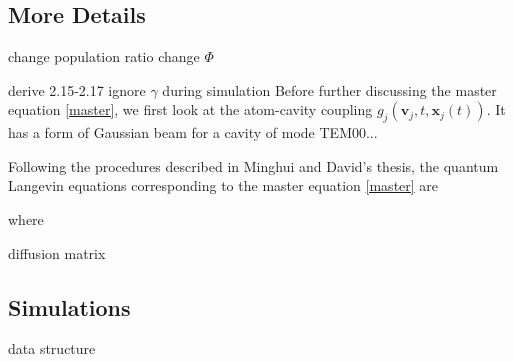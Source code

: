 \documentclass{article}
\begin{document}
\subsection{More Details}
change population ratio
change $\Phi$

derive 2.15-2.17
ignore $\gamma$ during simulation
Before further discussing the master equation \ref{master}, we first look at the atom-cavity coupling $g_j(\textbf{v}_j,t,\textbf{x}_j(t))$. It has a form of Gaussian beam for a cavity of mode TEM00...

Following the procedures described in Minghui and David's thesis, the quantum Langevin equations corresponding to the master equation \ref{master} are

where

diffusion matrix


\subsection{Simulations}
data structure

\printbibliography
\end{document}
